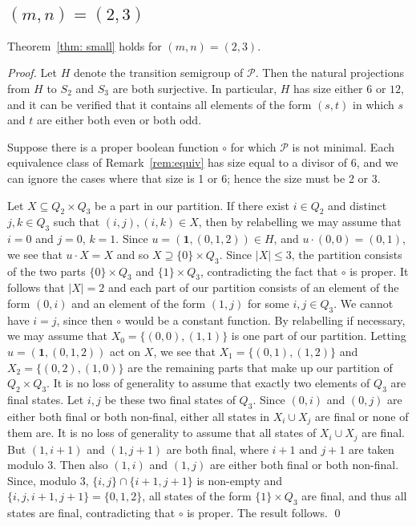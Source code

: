 \documentclass{llncs}
\newcommand{\cP}{{\mathcal P}}
\newcommand{\one}{{\mathbf 1}}
\begin{document}
\subsection{$(m,n)=(2,3)$}
\begin{proposition}
Theorem~\ref{thm: small} holds for $(m,n)=(2,3)$.
\end{proposition}
\begin{proof}
Let $H$ denote the transition semigroup of $\cP$.  Then the natural projections from $H$ to $S_2$ and $S_3$ are both surjective.  In particular, $H$ has size either $6$ or $12$, and it can be verified that it contains all elements of the form $(s,t)$ in which $s$ and $t$ are either both even or both odd.  

Suppose  there is a proper boolean function $\circ$ for which $\cP$ is not minimal.  
Each equivalence class of Remark~\ref{rem:equiv} has size equal to a divisor of $6$, and we can ignore the cases where that size is 1 or 6; hence the size must be 2 or 3.    

Let $X\subseteq Q_2\times Q_3$ be a part in our partition.  
If there exist $i\in Q_2$ and distinct $j,k\in Q_3$ such that $(i,j),(i,k)\in X$, then by relabelling we may assume that $i=0$ and $j=0$, $k=1$.  
Since $u=(\one, (0,1,2))\in H$, and $u\cdot (0,0)=(0,1)$, we see that $u\cdot X=X$ and so $X\supseteq \{0\}\times Q_3$.  
Since $|X|\le 3$,  the partition consists of the two parts $\{0\}\times Q_3$ and $\{1\}\times Q_3$, contradicting the fact that $\circ$ is proper.  
It follows that $|X|=2$ and each part of our partition consists of an element of the form $(0,i)$ and an element of the form $(1,j)$ for some $i,j\in Q_3$.  We cannot have $i=j$, since then  $\circ$ would be a constant function.  By relabelling if necessary, we may assume that $X_0=\{(0,0),(1,1)\}$ is one part of our partition.  Letting $u=(\one,(0,1,2))$ act on $X$, we see that
$X_1=\{(0,1),(1,2)\}$ and $X_2=\{(0,2),(1,0)\}$ are the remaining parts that make up our partition of $Q_2\times Q_3$.  It is no loss of generality to assume that exactly two elements of $Q_3$ are final states.  Let $i,j$ be these two final states of $Q_3$. Since $(0,i)$ and $(0,j)$ are either both final or both non-final, either all states in $X_i\cup X_j$ are final or none of them are.  
It is no loss of generality to assume that all states of $X_i\cup X_j$ are final.  
But  $(1,i+1)$ and $(1,j+1)$ are both final, where $i+1$ and $j+1$ are taken modulo $3$.  Then also $(1,i)$ and $(1,j)$ are either both final or both non-final.  Since, modulo $3$, $\{i,j\}\cap \{i+1,j+1\}$ is non-empty and $\{i,j,i+1,j+1\}=\{0,1,2\}$,  all states of the form $\{1\}\times Q_3$ are final, and thus all states are final, contradicting that $\circ$ is proper.  The result follows.
\qed
\end{proof}
\end{document}

